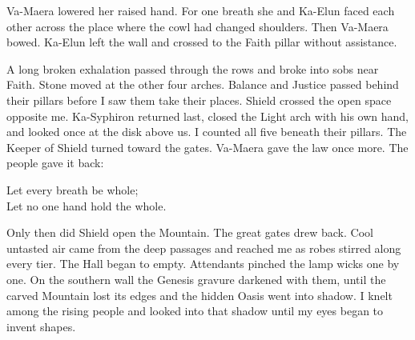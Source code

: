 Va-Maera lowered her raised hand. For one breath she and Ka-Elun faced each other across the place where the cowl had changed shoulders. Then Va-Maera bowed. Ka-Elun left the wall and crossed to the Faith pillar without assistance.\par

A long broken exhalation passed through the rows and broke into sobs near Faith. Stone moved at the other four arches. Balance and Justice passed behind their pillars before I saw them take their places. Shield crossed the open space opposite me. Ka-Syphiron returned last, closed the Light arch with his own hand, and looked once at the disk above us. I counted all five beneath their pillars. The Keeper of Shield turned toward the gates. Va-Maera gave the law once more. The people gave it back:\par

\begin{scripture}
Let every breath be whole;\\
Let no one hand hold the whole.
\end{scripture}

Only then did Shield open the Mountain. The great gates drew back. Cool untasted air came from the deep passages and reached me as robes stirred along every tier. The Hall began to empty. Attendants pinched the lamp wicks one by one. On the southern wall the Genesis gravure darkened with them, until the carved Mountain lost its edges and the hidden Oasis went into shadow. I knelt among the rising people and looked into that shadow until my eyes began to invent shapes.\par

